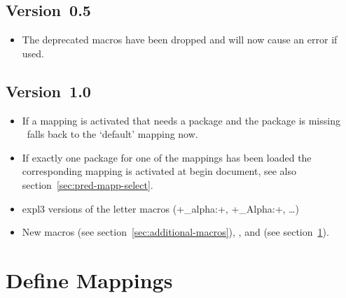 \documentclass[load-preamble+,scrartcl={listof=totoc}]{cnltx-doc}
\begin{document}
\subsection{Version~0.5}
\begin{itemize}
  \item The deprecated macros  have been dropped and
    will now cause an error if used.
\end{itemize}

\subsection{Version~1.0}
\begin{itemize}
  \item If a mapping is activated that needs a package and the package is
    missing \chemgreek\ falls back to the `default' mapping now.
  \item If exactly one package for one of the mappings has been loaded the
    corresponding mapping is activated at begin document, see also
    section~\ref{sec:pred-mapp-select}.
  \item expl3 versions of the letter macros (\verbcode+\chemgreek_alpha:+,
    \verbcode+\chemgreek_Alpha:+, \ldots)
  \item New macros  (see
    section~\ref{sec:additional-macros}), ,
     and  (see
    section~\ref{sec:define-mappings}).
\end{itemize}

\section{Define Mappings}\label{sec:define-mappings}
\end{document}
